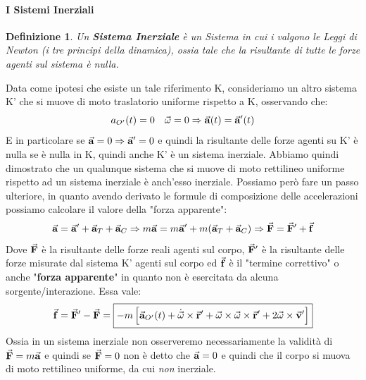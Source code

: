 \documentclass{article}
\newtheorem{defn}{Definizione}[section]
\newcommand{\then}{\ensuremath{\Rightarrow}}
\renewcommand{\a}{\va{a}}
\renewcommand{\v}{\va{v}}
\renewcommand{\r}{\va{r}}
\newcommand{\F}{\va{F}}
\newcommand{\f}{\va{f}}
\begin{document}
\paragraph{I Sistemi Inerziali}
\begin{defn}
Un \textbf{Sistema Inerziale} è un Sistema in cui i valgono le Leggi di Newton (i tre principi della dinamica), ossia tale che la risultante di tutte le forze agenti sul sistema è nulla.
\end{defn}
Data come ipotesi che esiste un tale riferimento K, consideriamo un altro sistema K' che si muove di moto traslatorio uniforme rispetto a K, osservando che:
\[a_{O'}(t)=0\quad\va{\omega}=0\then \a(t)=\a'(t)\]
E in particolare se $\a=0\then \a'=0$ e quindi la risultante delle forze agenti su K' è nulla se è nulla in K, quindi anche K' è un sistema inerziale. Abbiamo quindi dimostrato che un qualunque sistema che si muove di moto rettilineo uniforme rispetto ad un sistema inerziale è anch'esso inerziale.
Possiamo però fare un passo ulteriore, in quanto avendo derivato le formule di composizione delle accelerazioni possiamo calcolare il valore della "forza apparente":
\[\a=\a'+\a_T+\a_C\then m\a=m\a'+m(\a_T+\a_C)\then \F=\F'+\f\]
Dove $\F$ è la risultante delle forze reali agenti sul corpo, $\F'$ è la risultante delle forze misurate dal sistema K' agenti sul corpo ed $\f$ è il "termine correttivo" o anche "\textbf{forza apparente}" in quanto non è esercitata da alcuna sorgente/interazione. Essa vale:
\[\f=\F'-\F=\boxed{-m\left[\a_{O'}(t)+\dot{\va{\omega}}\times\r'+\va{\omega}\times\va{\omega}\times\r'+2\va{\omega}\times\v'\right]}\]
Ossia in un sistema inerziale non osserveremo necessariamente la validità di $\F=m\a$ e quindi se $\F=0$ non è detto che $\a=0$ e quindi che il corpo si muova di moto rettilineo uniforme, da cui \textit{non} inerziale.
\end{document}
